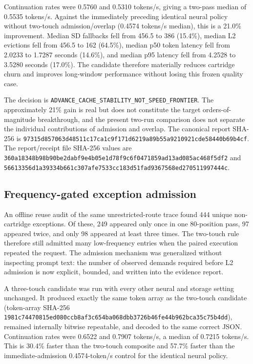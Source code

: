 Continuation rates were 0.5760 and 0.5310 tokens/s, giving a two-pass median of
0.5535 tokens/s.  Against the immediately preceding identical neural policy
without two-touch admission/overlap (0.4574 tokens/s median), this is a 21.0\%
improvement.  Median SD fallbacks fell from 456.5 to 386 (15.4\%), median L2
evictions fell from 456.5 to 162 (64.5\%), median p50 token latency fell from
2.0233 to 1.7287 seconds (14.6\%), and median p95 latency fell from 4.2528 to
3.5280 seconds (17.0\%).  The candidate therefore materially reduces cartridge
churn and improves long-window performance without losing this frozen quality
case.

The decision is \texttt{ADVANCE\_CACHE\_STABILITY\_NOT\_SPEED\_FRONTIER}.
The approximately 21\% gain is real but does not constitute the target
orders-of-magnitude breakthrough, and the present two-run comparison does not
separate the individual contributions of admission and overlap.  The canonical
report SHA-256 is
\texttt{97315d857063d48511c17ca1c9f171d6219a89b55a9210921cde58440b69b4cf}.
The report/receipt file SHA-256 values are
\texttt{360a18348b98b90be2dabf9e4b05e1d78f9c6f0471859ad13ad085ac468f5df2}
and
\texttt{56613356d1a39334b661c307afe7533cc183d51fad9367568ed270511997444c}.

\subsection{Frequency-gated exception admission}

An offline reuse audit of the same unrestricted-route trace found 444 unique
non-cartridge exceptions.  Of these, 249 appeared only once in one 80-position
pass, 97 appeared twice, and only 98 appeared at least three times.  The
two-touch rule therefore still admitted many low-frequency entries when the
paired execution repeated the request.  The admission mechanism was generalized
without inspecting prompt text: the number of observed demands required before
L2 admission is now explicit, bounded, and written into the evidence report.

A three-touch candidate was run with every other neural and storage setting
unchanged.  It produced exactly the same token array as the two-touch candidate
(token-array SHA-256
\texttt{1981c74470815ed080ccb8af3c654ba068dbb3726b46fe44b962bca35c75b4dd}),
remained internally bitwise repeatable, and decoded to the same correct JSON.
Continuation rates were 0.6522 and 0.7907 tokens/s, a median of 0.7215 tokens/s.
This is 30.4\% faster than the two-touch composite and 57.7\% faster than the
immediate-admission 0.4574-token/s control for the identical neural policy.


